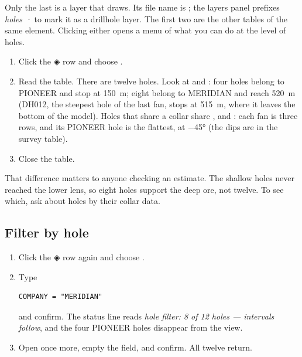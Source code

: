 Only the last is a layer that draws. Its file name is ; the layers panel prefixes \emph{holes ·} to mark it as a drillhole layer. The first two are the other tables of the same element. Clicking either opens a menu of what you can do at the level of holes.

\begin{tryit}
\begin{enumerate}
\item Click the ◈ row and choose .
\item Read the table. There are twelve holes. Look at  and : four holes belong to PIONEER and stop at 150~m; eight belong to MERIDIAN and reach 520~m (DH012, the steepest hole of the last fan, stops at 515~m, where it leaves the bottom of the model). Holes that share a collar share ,  and : each fan is three rows, and its PIONEER hole is the flattest, at −45° (the dips are in the survey table).
\item Close the table.
\end{enumerate}
\end{tryit}


That difference matters to anyone checking an estimate. The shallow holes never reached the lower lens, so eight holes support the deep ore, not twelve. To see which, ask about holes by their collar data.

\subsection{Filter by hole}
\begin{tryit}
\begin{enumerate}
\item Click the ◈ row again and choose .
\item Type
\begin{lstlisting}[language=expr]
COMPANY = "MERIDIAN"
\end{lstlisting}
and confirm. The status line reads \emph{hole filter: 8 of 12 holes — intervals follow}, and the four PIONEER holes disappear from the view.
\item Open  once more, empty the field, and confirm. All twelve return.
\end{enumerate}
\end{tryit}

